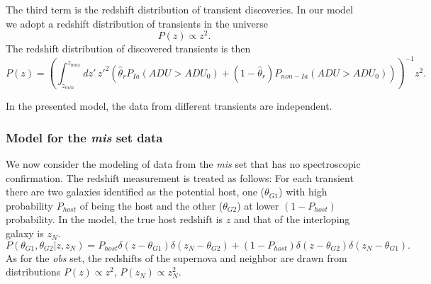 \documentclass[preprint]{elsarticle}
\begin{document}
The third term is the redshift distribution of transient discoveries.
In our model we adopt
a redshift distribution of transients in the universe
\begin{equation}
P(z) \propto z^2.
\end{equation}
The redshift distribution of discovered transients is then
\begin{equation}
P(z) = \left(\int_{z_{min}}^{z_{max}} dz'\, z'^2\left( 
\hat{\theta}_{r}P_{Ia}(\mathit{ADU} > \mathit{ADU}_0) + (1-\hat{\theta}_{r})P_{non-Ia}(\mathit{ADU} > \mathit{ADU}_0)
\right)\right)^{-1}z^2.
\end{equation}

In the presented model, the data from different transients are independent.

\subsubsection{Model for the {\it mis} set data}

We now consider the modeling of data from the  {\it mis}
set that has no spectroscopic confirmation.
The redshift measurement is treated as follows:
For each transient there are two galaxies identified as
the potential host, one ($\theta_{G1}$) with high probability $P_{host}$
of being the host and the other
($\theta_{G2}$) at lower $(1-P_{host})$ probability.
In the model, the
true host redshift is $z$ and that of the interloping galaxy is $z_N$.
\begin{equation}
P(\theta_{G1},\theta_{G2}|z, z_N) =
	P_{host}\delta(z-\theta_{G1})\delta(z_N-\theta_{G2}) +
	(1-P_{host}) \delta(z-\theta_{G2})\delta(z_N-\theta_{G1}).
\end{equation}
As for the {\it obs} set, the redshifts of the supernova
 and neighbor are drawn from distributions $P(z) \propto z^2$, $P(z_N) \propto z^2_N$.
\end{document}
